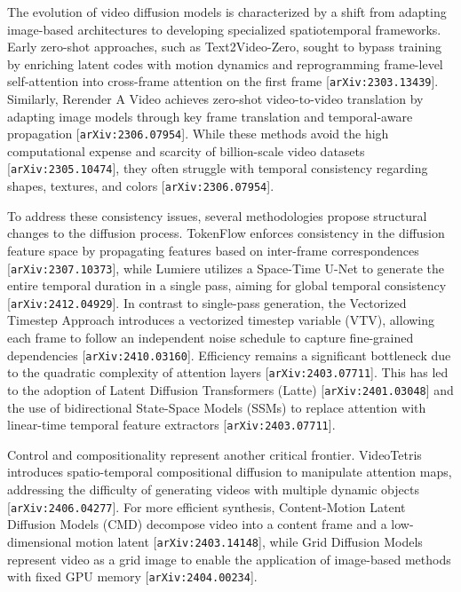\documentclass[11pt]{article}
\begin{document}
The evolution of video diffusion models is characterized by a shift from adapting image-based architectures to developing specialized spatiotemporal frameworks. Early zero-shot approaches, such as Text2Video-Zero, sought to bypass training by enriching latent codes with motion dynamics and reprogramming frame-level self-attention into cross-frame attention on the first frame [\texttt{arXiv:2303.13439}]. Similarly, Rerender A Video achieves zero-shot video-to-video translation by adapting image models through key frame translation and temporal-aware propagation [\texttt{arXiv:2306.07954}]. While these methods avoid the high computational expense and scarcity of billion-scale video datasets [\texttt{arXiv:2305.10474}], they often struggle with temporal consistency regarding shapes, textures, and colors [\texttt{arXiv:2306.07954}].

To address these consistency issues, several methodologies propose structural changes to the diffusion process. TokenFlow enforces consistency in the diffusion feature space by propagating features based on inter-frame correspondences [\texttt{arXiv:2307.10373}], while Lumiere utilizes a Space-Time U-Net to generate the entire temporal duration in a single pass, aiming for global temporal consistency [\texttt{arXiv:2412.04929}]. In contrast to single-pass generation, the Vectorized Timestep Approach introduces a vectorized timestep variable (VTV), allowing each frame to follow an independent noise schedule to capture fine-grained dependencies [\texttt{arXiv:2410.03160}]. Efficiency remains a significant bottleneck due to the quadratic complexity of attention layers [\texttt{arXiv:2403.07711}]. This has led to the adoption of Latent Diffusion Transformers (Latte) [\texttt{arXiv:2401.03048}] and the use of bidirectional State-Space Models (SSMs) to replace attention with linear-time temporal feature extractors [\texttt{arXiv:2403.07711}].

Control and compositionality represent another critical frontier. VideoTetris introduces spatio-temporal compositional diffusion to manipulate attention maps, addressing the difficulty of generating videos with multiple dynamic objects [\texttt{arXiv:2406.04277}]. For more efficient synthesis, Content-Motion Latent Diffusion Models (CMD) decompose video into a content frame and a low-dimensional motion latent [\texttt{arXiv:2403.14148}], while Grid Diffusion Models represent video as a grid image to enable the application of image-based methods with fixed GPU memory [\texttt{arXiv:2404.00234}].
\end{document}
